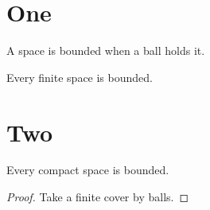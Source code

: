 \documentclass[final]{siamltex}
\begin{document}
\section{One}
\begin{definition} A space is bounded when a ball holds it. \end{definition}
\begin{proposition} Every finite space is bounded. \end{proposition}
\section{Two}
\begin{theorem} Every compact space is bounded. \end{theorem}
\begin{proof} Take a finite cover by balls. \end{proof}
\end{document}
